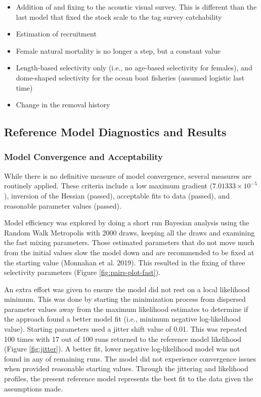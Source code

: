 \documentclass[11pt,
  english,
  letterpaper,
]{article}
\providecommand{\tightlist}{%
  \setlength{\itemsep}{0pt}\setlength{\parskip}{0pt}}
\providecommand{\tightlist}{%
  \setlength{\itemsep}{0pt}\setlength{\parskip}{0pt}}
\begin{document}
\begin{itemize}
\tightlist
\item
  Addition of and fixing to the acoustic visual survey. This is different than the last model that fixed the stock scale to the tag survey catchability
\item
  Estimation of recruitment
\item
  Female natural mortality is no longer a step, but a constant value
\item
  Length-based selectivity only (i.e., no age-based selectivity for females), and dome-shaped selectivity for the ocean boat fisheries (assumed logistic last time)
\item
  Change in the removal history
\end{itemize}

\hypertarget{reference-model-diagnostics-and-results}{%
\subsection{Reference Model Diagnostics and Results}\label{reference-model-diagnostics-and-results}}

\hypertarget{model-convergence-and-acceptability}{%
\subsubsection{Model Convergence and Acceptability}\label{model-convergence-and-acceptability}}

While there is no definitive measure of model convergence, several measures are routinely applied. These criteria include a low maximum gradient (\ensuremath{7.01333\times 10^{-5}}), inversion of the Hessian (passed), acceptable fits to data (passed), and reasonable parameter values (passed).

Model efficiency was explored by doing a short run Bayesian analysis using the Random Walk Metropolis with 2000 draws, keeping all the draws and examining the fast mixing parameters. Those estimated parameters that do not move much from the initial values slow the model down and are recommended to be fixed at the starting value (Monnahan et al. 2019). This resulted in the fixing of three selectivity parameters (Figure \ref{fig:pairs-plot-fast}).

An extra effort was given to ensure the model did not rest on a local likelihood minimum. This was done by starting the minimization process from dispersed parameter values away from the maximum likelihood estimates to determine if the approach found a better model fit (i.e., minimum negative log-likelihood value). Starting parameters used a jitter shift value of 0.01. This was repeated 100 times with 17 out of 100 runs returned to the reference model likelihood (Figure \ref{fig:jitter}). A better fit, lower negative log-likelihood model was not found in any of remaining runs. The model did not experience convergence issues when provided reasonable starting values. Through the jittering and likelihood profiles, the present reference model represents the best fit to the data given the assumptions made.
\end{document}
